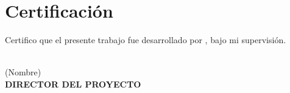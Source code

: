 \chapter*{Certificación}

Certifico que el presente trabajo fue desarrollado por \theauthor, bajo mi
supervisión.
\vspace{1.5cm}

\begin{flushright}
\makebox[5cm]{\hrulefill} \\
(Nombre) \\
\bf\MakeUppercase{Director del Proyecto}
\end{flushright}
